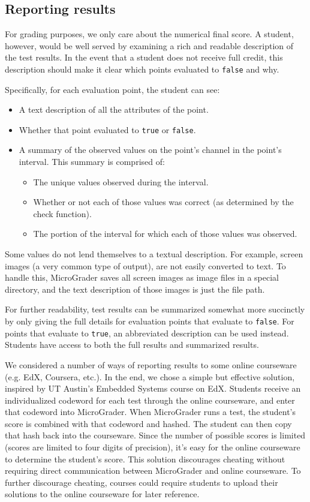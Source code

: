 \documentclass[12pt]{article}
\begin{document}
\subsection{Reporting results}
For grading purposes, we only care about the numerical final score.  A student, however, would be well served by examining a rich and readable description of the test results.  In the event that a student does not receive full credit, this description should make it clear which points evaluated to \texttt{false} and why.

Specifically, for each evaluation point, the student can see:

\begin{itemize}
\item A text description of all the attributes of the point.
\item Whether that point evaluated to \texttt{true} or \texttt{false}.
\item A summary of the observed values on the point's channel in the point's interval.  This summary is comprised of:
\begin{itemize}
\item The unique values observed during the interval.
\item Whether or not each of those values was correct (as determined by the check function).
\item The portion of the interval for which each of those values was observed.
\end{itemize}
\end{itemize}

Some values do not lend themselves to a textual description.  For example, screen images (a very common type of output), are not easily converted to text.  To handle this, MicroGrader saves all screen images as image files in a special directory, and the text description of those images is just the file path.

For further readability, test results can be summarized somewhat more succinctly by only giving the full details for evaluation points that evaluate to \texttt{false}.  For points that evaluate to \texttt{true}, an abbreviated description can be used instead.  Students have access to both the full results and summarized results.

We considered a number of ways of reporting results to some online courseware (e.g. EdX, Coursera, etc.).  In the end, we chose a simple but effective solution, inspired by UT Austin's Embedded Systems course on EdX.  Students receive an individualized codeword for each test through the online courseware, and enter that codeword into MicroGrader.  When MicroGrader runs a test, the student's score is combined with that codeword and hashed.  The student can then copy that hash back into the courseware.  Since the number of possible scores is limited (scores are limited to four digits of precision), it's easy for the online courseware to determine the student's score.  This solution discourages cheating without requiring direct communication between MicroGrader and online courseware.  To further discourage cheating, courses could require students to upload their solutions to the online courseware for later reference.
\end{document}
